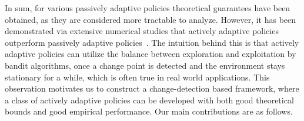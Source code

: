 \documentclass[letterpaper]{article} %
\begin{document}
In sum, for various passively adaptive policies theoretical guarantees have been obtained, as they are considered more tractable to analyze. However, it has been demonstrated via extensive numerical studies that actively adaptive policies outperform passively adaptive policies~\cite{mellor2013thompson}. The intuition behind this is that actively adaptive policies can utilize the balance between exploration and exploitation by bandit algorithms, once a change point is detected and the environment stays stationary for a while, which is often true in real world applications. This observation motivates us to construct a change-detection based framework, where a class of actively adaptive policies can be developed with both good theoretical bounds and good empirical performance. Our main contributions are as follows.
\vspace{-3pt}
\end{document}

